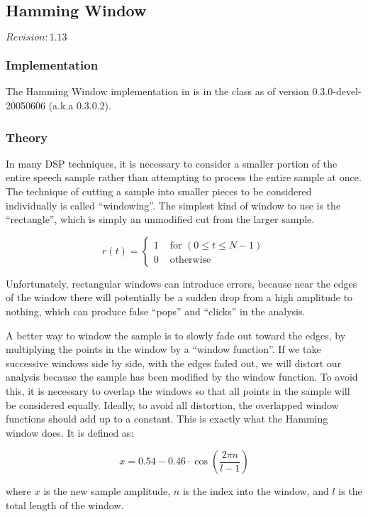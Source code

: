 \subsection{Hamming Window}

$Revision: 1.13 $

\subsubsection{Implementation}

The Hamming Window implementation in {\marf} is in the
 class as of
version 0.3.0-devel-20050606 (a.k.a 0.3.0.2).

\subsubsection{Theory}

In many DSP techniques, it is necessary to consider a smaller portion of the
entire speech sample rather than attempting to process the entire sample at
once.  The technique of cutting a sample into smaller pieces to be considered
individually is called ``windowing''.  The simplest kind of window to use is
the ``rectangle'', which is simply an unmodified cut from the larger sample.

$$
r(t) =
\left\{
{
	\begin{array}{ll}
		1 & \mbox{ for } (0 \le t \le N-1) \\
		0 & \mbox{ otherwise }
	\end{array}
}
\right.
$$

Unfortunately, rectangular windows can introduce errors, because near the edges
of the window there will potentially be a sudden drop from a high amplitude
to nothing, which can produce false ``pops'' and ``clicks'' in the analysis.

A better way to window the sample is to slowly fade out toward the edges, by
multiplying the points in the window by a ``window function''.  If we take
successive windows side by side, with the edges faded out, we will distort
our analysis because the sample has been modified by the window function.
To avoid this, it is necessary to overlap the windows so that all points in
the sample will be considered equally.  Ideally, to avoid all distortion, the
overlapped window functions should add up to a constant.  This is exactly what
the Hamming window does.  It is defined as:

$$ x = 0.54 - 0.46 \cdot \cos\left(\frac{2 \pi n}{l-1}\right) $$

\noindent
where $x$ is the new sample amplitude, $n$ is the index into the window, and $l$ is
the total length of the window.

